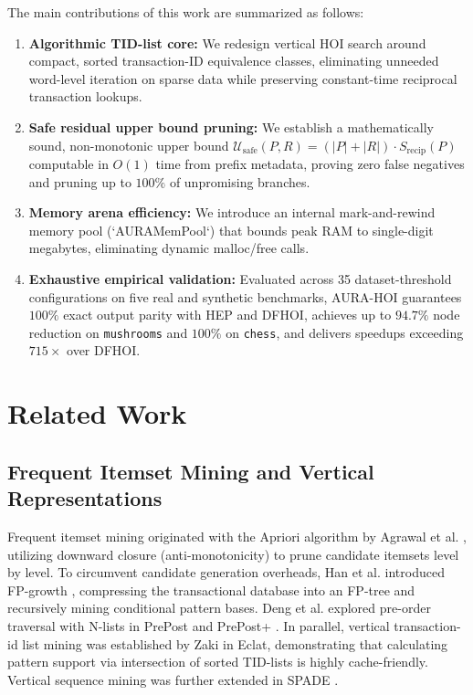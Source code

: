 \documentclass[runningheads,orivec]{llncs}
\newcommand{\AURA}{\textsc{AURA-HOI}}
\newcommand{\HEP}{\textsc{HEP}}
\newcommand{\DFHOI}{\textsc{DFHOI}}
\begin{document}
The main contributions of this work are summarized as follows:
\begin{enumerate}
    \item \textbf{Algorithmic TID-list core:} We redesign vertical HOI search around compact, sorted transaction-ID equivalence classes, eliminating unneeded word-level iteration on sparse data while preserving constant-time reciprocal transaction lookups.
    \item \textbf{Safe residual upper bound pruning:} We establish a mathematically sound, non-monotonic upper bound $\mathcal{U}_{\mathrm{safe}}(P, R) = (|P| + |R|) \cdot S_{\mathrm{recip}}(P)$ computable in $O(1)$ time from prefix metadata, proving zero false negatives and pruning up to $100\%$ of unpromising branches.
    \item \textbf{Memory arena efficiency:} We introduce an internal mark-and-rewind memory pool (`AURAMemPool`) that bounds peak RAM to single-digit megabytes, eliminating dynamic malloc/free calls.
    \item \textbf{Exhaustive empirical validation:} Evaluated across 35 dataset-threshold configurations on five real and synthetic benchmarks, \AURA{} guarantees $100\%$ exact output parity with \HEP{} and \DFHOI{}, achieves up to $94.7\%$ node reduction on \texttt{mushrooms} and $100\%$ on \texttt{chess}, and delivers speedups exceeding $715\times$ over \DFHOI.
\end{enumerate}

\section{Related Work}

\subsection{Frequent Itemset Mining and Vertical Representations}
Frequent itemset mining originated with the Apriori algorithm by Agrawal et al. \cite{agrawal1993mining,agrawal1994fast}, utilizing downward closure (anti-monotonicity) to prune candidate itemsets level by level. To circumvent candidate generation overheads, Han et al. introduced FP-growth \cite{han2000mining}, compressing the transactional database into an FP-tree and recursively mining conditional pattern bases. Deng et al. explored pre-order traversal with N-lists in PrePost \cite{deng2012new} and PrePost+ \cite{deng2015prepost}. In parallel, vertical transaction-id list mining was established by Zaki \cite{zaki1997new,zaki2000scalable} in Eclat, demonstrating that calculating pattern support via intersection of sorted TID-lists is highly cache-friendly. Vertical sequence mining was further extended in SPADE \cite{zaki2001spade}. 
\end{document}
